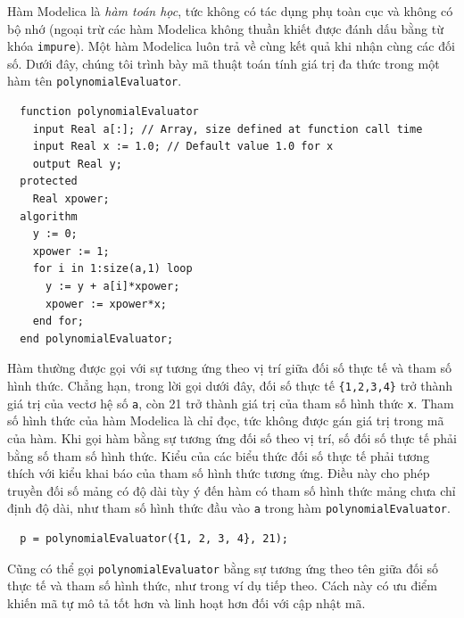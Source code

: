 Hàm Modelica là \emph{hàm toán học}, tức không có tác dụng phụ toàn cục và không có bộ nhớ (ngoại trừ các hàm Modelica không thuần khiết được đánh dấu bằng từ khóa \texttt{impure}). Một hàm Modelica luôn trả về cùng kết quả khi nhận cùng các đối số. Dưới đây, chúng tôi trình bày mã thuật toán tính giá trị đa thức trong một hàm tên \texttt{polynomialEvaluator}.

\begin{verbatim}
  function polynomialEvaluator
    input Real a[:]; // Array, size defined at function call time
    input Real x := 1.0; // Default value 1.0 for x
    output Real y;
  protected
    Real xpower;
  algorithm
    y := 0;
    xpower := 1;
    for i in 1:size(a,1) loop
      y := y + a[i]*xpower;
      xpower := xpower*x;
    end for;
  end polynomialEvaluator;
\end{verbatim}
Hàm thường được gọi với sự tương ứng theo vị trí giữa đối số thực tế và tham số hình thức. Chẳng hạn, trong lời gọi dưới đây, đối số thực tế \texttt{\{1,2,3,4\}} trở thành giá trị của vectơ hệ số \texttt{a}, còn 21 trở thành giá trị của tham số hình thức \texttt{x}. Tham số hình thức của hàm Modelica là chỉ đọc, tức không được gán giá trị trong mã của hàm. Khi gọi hàm bằng sự tương ứng đối số theo vị trí, số đối số thực tế phải bằng số tham số hình thức. Kiểu của các biểu thức đối số thực tế phải tương thích với kiểu khai báo của tham số hình thức tương ứng. Điều này cho phép truyền đối số mảng có độ dài tùy ý đến hàm có tham số hình thức mảng chưa chỉ định độ dài, như tham số hình thức đầu vào \texttt{a} trong hàm \texttt{polynomialEvaluator}.
\begin{verbatim}
  p = polynomialEvaluator({1, 2, 3, 4}, 21);
\end{verbatim}
Cũng có thể gọi \texttt{polynomialEvaluator} bằng sự tương ứng theo tên giữa đối số thực tế và tham số hình thức, như trong ví dụ tiếp theo. Cách này có ưu điểm khiến mã tự mô tả tốt hơn và linh hoạt hơn đối với cập nhật mã.

